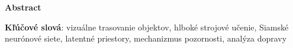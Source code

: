 \thispagestyle{plain}

\begin{center}
    \Large{\textbf{Abstract}}
\end{center}

\noindent \textbf{Kľúčové slová}: vizuálne trasovanie objektov, hlboké strojové učenie, Siamské neurónové siete, latentné priestory, mechanizmus pozornosti, analýza dopravy
